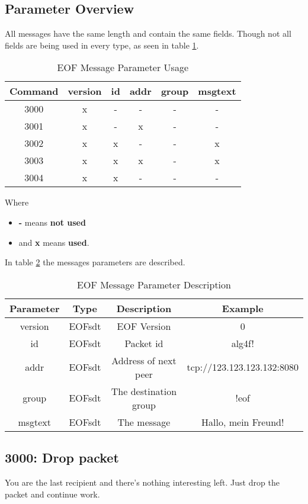 \subsection{Parameter Overview}
All messages have the same length and contain the same fields.
Though not all fields are being used in every type, as seen in table
\ref{eofmessageparameteroverview}.
\begin{longtable}{|c|c|c|c|c|c|}
\caption{EOF Message Parameter Usage}
\label{eofmessageparameteroverview}
\\
\hline
\textbf{Command} & \textbf{version} & \textbf{id} & \textbf{addr} & \textbf{group} & \textbf{msgtext}\\
\hline
3000 &x & - & - & - & - \\
\hline
3001 &x & - & x & - & - \\
\hline
3002 &x & x & - & - & x \\
\hline
3003 &x & x & x & - & x \\
\hline
3004 &x & x & - & - & -\\
\hline
\end{longtable}
Where 
\begin{itemize}
\item \textbf{-} means \textbf{not used}
\item and \textbf{x} means \textbf{used}.
\end{itemize}
In table \ref{eofmessagedescription} the messages
parameters are described.
\begin{longtable}{|c|c|c|c|}
\caption{EOF Message Parameter Description}
\label{eofmessagedescription}
\\
\hline
\textbf{Parameter} & \textbf{Type} & \textbf{Description} & \textbf{Example}\\
\hline
version & EOFsdt & EOF Version & 0\\
\hline
id & EOFsdt & Packet id & alg4f!\\
\hline
addr & EOFsdt & Address of next peer & tcp://123.123.123.132:8080\\
\hline
group & EOFsdt & The destination group & !eof\\
\hline
msgtext & EOFsdt & The message & Hallo, mein Freund!\\
\hline
\end{longtable}
\subsection{3000: Drop packet}
You are the last recipient and there's nothing interesting left.
Just drop the packet and continue work.
